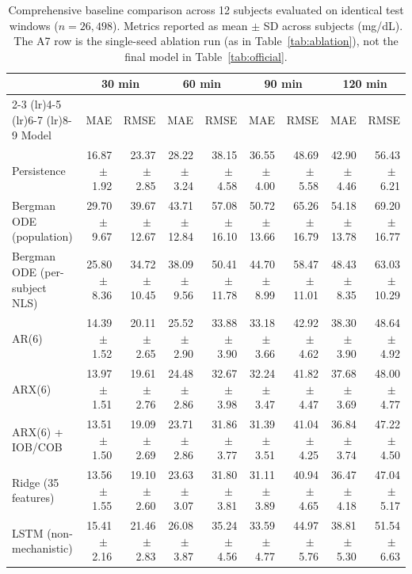 \documentclass[journal]{IEEEtran}
\begin{document}
\begin{table}[t]
\centering
\caption{Comprehensive baseline comparison across 12 subjects evaluated on identical test windows ($n=26{,}498$). Metrics reported as mean $\pm$ SD across subjects (mg/dL). The A7 row is the single-seed ablation run (as in Table~\ref{tab:ablation}), not the final model in Table~\ref{tab:official}.}
\label{tab:baselines_identical}
\footnotesize
\setlength{\tabcolsep}{2.3pt}
\begin{tabular}{lrrrrrrrr}
\toprule
& \multicolumn{2}{c}{30 min} & \multicolumn{2}{c}{60 min} & \multicolumn{2}{c}{90 min} & \multicolumn{2}{c}{120 min} \\
\cmidrule(lr){2-3} \cmidrule(lr){4-5} \cmidrule(lr){6-7} \cmidrule(lr){8-9}
Model & MAE & RMSE & MAE & RMSE & MAE & RMSE & MAE & RMSE \\
\midrule
Persistence & 16.87$\,\pm\,$1.92 & 23.37$\,\pm\,$2.85 & 28.22$\,\pm\,$3.24 & 38.15$\,\pm\,$4.58 & 36.55$\,\pm\,$4.00 & 48.69$\,\pm\,$5.58 & 42.90$\,\pm\,$4.46 & 56.43$\,\pm\,$6.21 \\
Bergman ODE (population) & 29.70$\,\pm\,$9.67 & 39.67$\,\pm\,$12.67 & 43.71$\,\pm\,$12.84 & 57.08$\,\pm\,$16.10 & 50.72$\,\pm\,$13.66 & 65.26$\,\pm\,$16.79 & 54.18$\,\pm\,$13.78 & 69.20$\,\pm\,$16.77 \\
Bergman ODE (per-subject NLS) & 25.80$\,\pm\,$8.36 & 34.72$\,\pm\,$10.45 & 38.09$\,\pm\,$9.56 & 50.41$\,\pm\,$11.78 & 44.70$\,\pm\,$8.99 & 58.47$\,\pm\,$11.01 & 48.43$\,\pm\,$8.35 & 63.03$\,\pm\,$10.29 \\
AR(6) & 14.39$\,\pm\,$1.52 & 20.11$\,\pm\,$2.65 & 25.52$\,\pm\,$2.90 & 33.88$\,\pm\,$3.90 & 33.18$\,\pm\,$3.66 & 42.92$\,\pm\,$4.62 & 38.30$\,\pm\,$3.90 & 48.64$\,\pm\,$4.92 \\
ARX(6) & 13.97$\,\pm\,$1.51 & 19.61$\,\pm\,$2.76 & 24.48$\,\pm\,$2.86 & 32.67$\,\pm\,$3.98 & 32.24$\,\pm\,$3.47 & 41.82$\,\pm\,$4.47 & 37.68$\,\pm\,$3.69 & 48.00$\,\pm\,$4.77 \\
ARX(6) + IOB/COB & 13.51$\,\pm\,$1.50 & 19.09$\,\pm\,$2.69 & 23.71$\,\pm\,$2.86 & 31.86$\,\pm\,$3.77 & 31.39$\,\pm\,$3.51 & 41.04$\,\pm\,$4.25 & 36.84$\,\pm\,$3.74 & 47.22$\,\pm\,$4.50 \\
Ridge (35 features) & 13.56$\,\pm\,$1.55 & 19.10$\,\pm\,$2.60 & 23.63$\,\pm\,$3.07 & 31.80$\,\pm\,$3.81 & 31.11$\,\pm\,$3.89 & 40.94$\,\pm\,$4.65 & 36.47$\,\pm\,$4.18 & 47.04$\,\pm\,$5.17 \\
LSTM (non-mechanistic) & 15.41$\,\pm\,$2.16 & 21.46$\,\pm\,$2.83 & 26.08$\,\pm\,$3.87 & 35.24$\,\pm\,$4.56 & 33.59$\,\pm\,$4.77 & 44.97$\,\pm\,$5.76 & 38.81$\,\pm\,$5.30 & 51.54$\,\pm\,$6.63 \\

\end{tabular}
\end{table}
\end{document}
